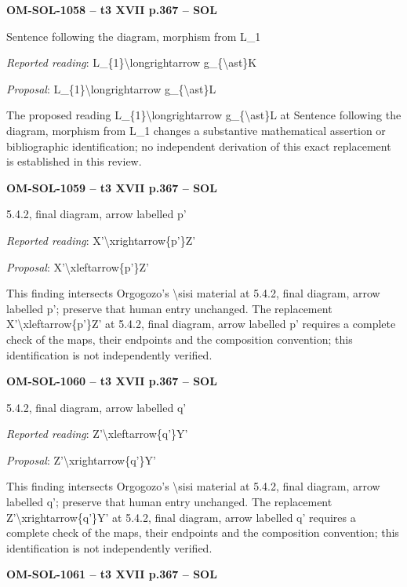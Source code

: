 \par\noindent\textbf{OM-SOL-1058 -- t3 XVII p.367 -- SOL}\par
Sentence following the diagram, morphism from L\_1\par
\emph{Reported reading}: L\_\{1\}\textbackslash{}longrightarrow g\_\{\textbackslash{}ast\}K\par
\emph{Proposal}: L\_\{1\}\textbackslash{}longrightarrow g\_\{\textbackslash{}ast\}L\par
The proposed reading L\_\{1\}\textbackslash{}longrightarrow g\_\{\textbackslash{}ast\}L at Sentence following the diagram, morphism from L\_1 changes a substantive mathematical assertion or bibliographic identification; no independent derivation of this exact replacement is established in this review.\par
\par\noindent\textbf{OM-SOL-1059 -- t3 XVII p.367 -- SOL}\par
5.4.2, final diagram, arrow labelled p'\par
\emph{Reported reading}: X'\textbackslash{}xrightarrow\{p'\}Z'\par
\emph{Proposal}: X'\textbackslash{}xleftarrow\{p'\}Z'\par
This finding intersects Orgogozo's \textbackslash{}sisi material at 5.4.2, final diagram, arrow labelled p'; preserve that human entry unchanged. The replacement X'\textbackslash{}xleftarrow\{p'\}Z' at 5.4.2, final diagram, arrow labelled p' requires a complete check of the maps, their endpoints and the composition convention; this identification is not independently verified.\par
\par\noindent\textbf{OM-SOL-1060 -- t3 XVII p.367 -- SOL}\par
5.4.2, final diagram, arrow labelled q'\par
\emph{Reported reading}: Z'\textbackslash{}xleftarrow\{q'\}Y'\par
\emph{Proposal}: Z'\textbackslash{}xrightarrow\{q'\}Y'\par
This finding intersects Orgogozo's \textbackslash{}sisi material at 5.4.2, final diagram, arrow labelled q'; preserve that human entry unchanged. The replacement Z'\textbackslash{}xrightarrow\{q'\}Y' at 5.4.2, final diagram, arrow labelled q' requires a complete check of the maps, their endpoints and the composition convention; this identification is not independently verified.\par
\par\noindent\textbf{OM-SOL-1061 -- t3 XVII p.367 -- SOL}\par
